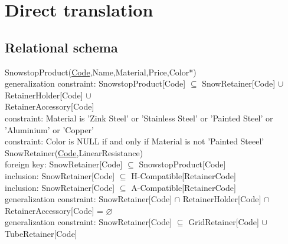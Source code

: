 \documentclass{article}[h]
\begin{document}
\pagebreak

\section{Direct translation}

\subsection{Relational schema}

\vspace{12px}

{\color{ForestGreen}SnowstopProduct(\underline{Code},Name,Material,Price,Color*)}\\
{\color{Orange}\hspace{2mm} generalization constraint: {\color{Magenta} SnowstopProduct[Code] $\subseteq $ SnowRetainer[Code] $\cup$ RetainerHolder[Code] $\cup$ }} \\ 
{{\color{Magenta}\hspace{39mm} RetainerAccessory[Code] }} \\
{\color{Orange}\hspace{2mm} constraint: {\color{Magenta}Material is 'Zink Steel' or 'Stainless Steel' or 'Painted Steel' or 'Aluminium' or 'Copper'}} \\ 
{\color{Orange}\hspace{2mm} constraint: {\color{Magenta}Color is NULL if and only if Material is not 'Painted Steeel'}} \\ 

{\color{ForestGreen}SnowRetainer(\underline{Code},LinearResistance)}\\
{\color{Orange}\hspace{2mm} foreign key: {\color{Magenta}SnowRetainer[Code] $\subseteq$ SnowstopProduct[Code]}} \\
{\color{Orange}\hspace{2mm} inclusion: {\color{Magenta}SnowRetainer[Code] $\subseteq$ H-Compatible[RetainerCode]}} \\
{\color{Orange}\hspace{2mm} inclusion: {\color{Magenta}SnowRetainer[Code] $\subseteq$ A-Compatible[RetainerCode]}} \\
{\color{Orange}\hspace{2mm} generalization constraint: {\color{Magenta} SnowRetainer[Code] $\cap $ RetainerHolder[Code] $\cap$ RetainerAccessory[Code] = $\varnothing $}} \\ 
{\color{Orange}\hspace{2mm} generalization constraint: {\color{Magenta} SnowRetainer[Code] $\subseteq $ GridRetainer[Code] $\cup$ TubeRetainer[Code] }} \\ 
\end{document}
